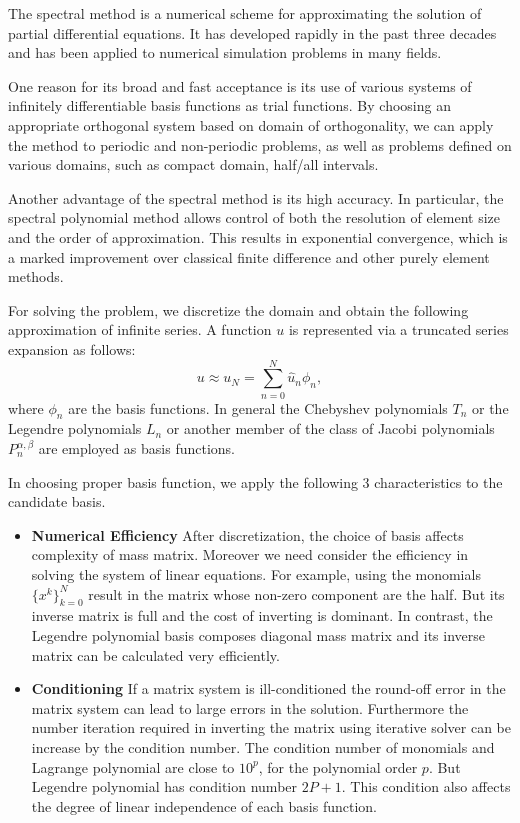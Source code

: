 

The spectral method is a numerical scheme for approximating the
solution of partial differential equations. It has developed
rapidly in the past three decades and has been applied to
numerical simulation problems in many fields.

One reason for its broad and fast acceptance is its use of various
systems of infinitely differentiable basis functions as trial
functions. By choosing an appropriate orthogonal system based on
domain of orthogonality, we can apply the method to periodic and
non-periodic problems, as well as problems defined on various
domains, such as compact domain, half/all intervals.

Another advantage of the spectral method is its high accuracy. In
particular, the spectral polynomial method allows control of both
the resolution of element size and the order of approximation.
This results in exponential convergence, which is a marked
improvement over classical finite difference and other purely
element methods.

For solving the problem, we discretize the domain and obtain the
following approximation of infinite series. A function $u$ is
represented via a truncated series expansion as follows:
\begin{equation}
\label{solapprx}
u \approx u_N = \sum_{n=0}^{N} \hat u_n \phi_n,
\end{equation}
where $\phi_n$ are the basis functions. In general the Chebyshev
polynomials $T_n$ or the Legendre polynomials $L_n$ or another
member of the class of Jacobi polynomials $P_n^{\alpha, \beta}$
are employed as basis functions.

In choosing proper basis function, we apply the following 3
characteristics to the candidate basis.
\begin{itemize}
\item {\bf Numerical Efficiency} After discretization,
the choice of basis affects complexity of mass matrix. Moreover we
need consider the efficiency in solving the system of linear
equations. For example, using the monomials $\{x^k\}_{k=0}^{N}$
result in the matrix whose non-zero component are the half. But
its inverse matrix is full and the cost of inverting is dominant.
In contrast, the Legendre polynomial basis composes diagonal mass
matrix and its inverse matrix can be calculated very efficiently.
\item {\bf Conditioning} If a matrix system is ill-conditioned
the round-off error in the matrix system can lead to large errors
in the solution. Furthermore the number iteration required in
inverting the matrix using iterative solver can be increase by the
condition number. The condition number of monomials and Lagrange
polynomial are close to $10^p$, for the polynomial order $p$. But
Legendre polynomial has condition number $2P+1$. This condition
also affects the degree of linear independence of each basis
function.
\end{itemize}

